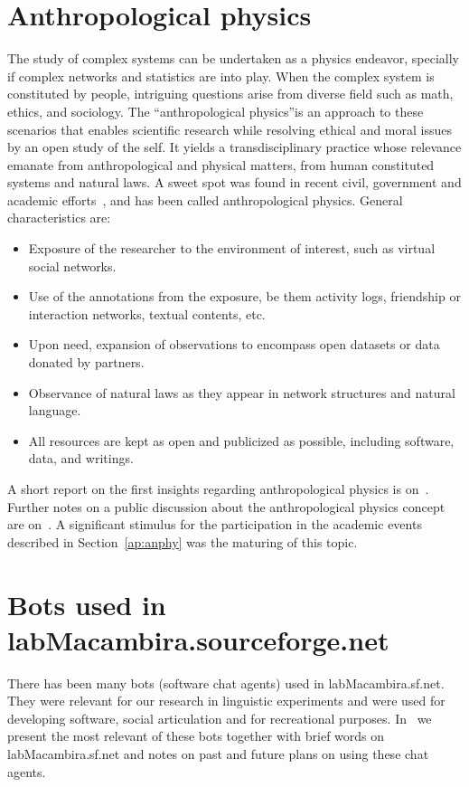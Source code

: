 \begin{apendicesenv}
\section{Anthropological physics}
The study of complex systems can be undertaken as a physics endeavor,
specially if complex networks and statistics are into play. When the complex
system is constituted by people, intriguing questions arise from diverse field such as math, ethics, and sociology. The “anthropological physics”is an approach to these scenarios that enables scientific research while resolving ethical and moral issues by an open study of the self.
	It yields a transdisciplinary practice whose relevance emanate from anthropological
and physical matters, from human constituted systems and natural laws.
A sweet spot was found in recent civil, government and academic efforts~\cite{opa,ensaio}, and has been called anthropological physics. General characteristics are:
\begin{itemize}
	\item Exposure of the researcher to the environment of interest, such as virtual social networks.
	\item Use of the annotations from the exposure, be them activity logs, friendship or interaction networks, textual contents, etc.
	\item Upon need, expansion of observations to encompass open datasets or data donated by partners.
	\item Observance of natural laws as they appear in network structures and natural language.
	\item All resources are kept as open and publicized as possible, including software, data, and writings.
\end{itemize}                                                                                                                                     
A short report on the first insights regarding anthropological physics is on~\cite{anPhy}.
Further notes on a public discussion about the anthropological physics concept are on~\cite{anPhy2}.
A significant stimulus for the participation in the academic events described in Section~\ref{ap:anphy}
was the maturing of this topic.

\section{Bots used in labMacambira.sourceforge.net}
There has been many bots (software chat agents) used in labMacambira.sf.net.
They were relevant for our research in linguistic experiments and were used
for developing software, social articulation and for recreational purposes.
In~\cite{trabBots} we present the most relevant of these bots together with
brief words on labMacambira.sf.net and notes on past and future plans on using
these chat agents.


\end{apendicesenv}
